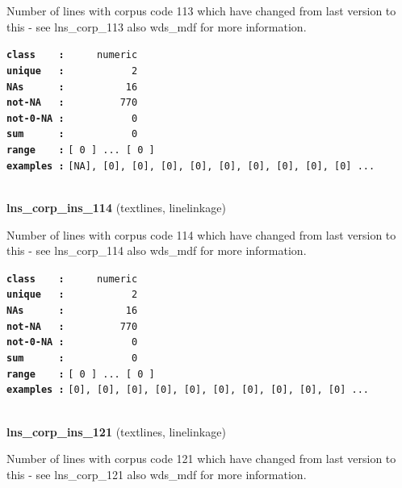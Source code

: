 \documentclass[]{article}
\begin{document}
Number of lines with corpus code 113 which have changed from last
version to this - see lns\_corp\_113 also wds\_mdf for more information.

\textbf{\texttt{class\ \ \ \ :}} \texttt{~~~~~numeric}\\
\textbf{\texttt{unique\ \ \ :}} \texttt{~~~~~~~~~~~2}\\
\textbf{\texttt{NAs\ \ \ \ \ \ :}} \texttt{~~~~~~~~~~16}\\
\textbf{\texttt{not-NA\ \ \ :}} \texttt{~~~~~~~~~770}\\
\textbf{\texttt{not-0-NA\ :}} \texttt{~~~~~~~~~~~0}\\
\textbf{\texttt{sum\ \ \ \ \ \ :}} \texttt{~~~~~~~~~~~0}\\
\textbf{\texttt{range\ \ \ \ :}}
\texttt{{[}\ 0\ {]}\ ...\ {[}\ 0\ {]}}\\
\textbf{\texttt{examples\ :}}
\texttt{{[}NA{]},\ {[}0{]},\ {[}0{]},\ {[}0{]},\ {[}0{]},\ {[}0{]},\ {[}0{]},\ {[}0{]},\ {[}0{]},\ {[}0{]}\ ...}\\

~

\textbf{lns\_corp\_ins\_114} (textlines, linelinkage)

Number of lines with corpus code 114 which have changed from last
version to this - see lns\_corp\_114 also wds\_mdf for more information.

\textbf{\texttt{class\ \ \ \ :}} \texttt{~~~~~numeric}\\
\textbf{\texttt{unique\ \ \ :}} \texttt{~~~~~~~~~~~2}\\
\textbf{\texttt{NAs\ \ \ \ \ \ :}} \texttt{~~~~~~~~~~16}\\
\textbf{\texttt{not-NA\ \ \ :}} \texttt{~~~~~~~~~770}\\
\textbf{\texttt{not-0-NA\ :}} \texttt{~~~~~~~~~~~0}\\
\textbf{\texttt{sum\ \ \ \ \ \ :}} \texttt{~~~~~~~~~~~0}\\
\textbf{\texttt{range\ \ \ \ :}}
\texttt{{[}\ 0\ {]}\ ...\ {[}\ 0\ {]}}\\
\textbf{\texttt{examples\ :}}
\texttt{{[}0{]},\ {[}0{]},\ {[}0{]},\ {[}0{]},\ {[}0{]},\ {[}0{]},\ {[}0{]},\ {[}0{]},\ {[}0{]},\ {[}0{]}\ ...}\\

~

\textbf{lns\_corp\_ins\_121} (textlines, linelinkage)

Number of lines with corpus code 121 which have changed from last
version to this - see lns\_corp\_121 also wds\_mdf for more information.
\end{document}
